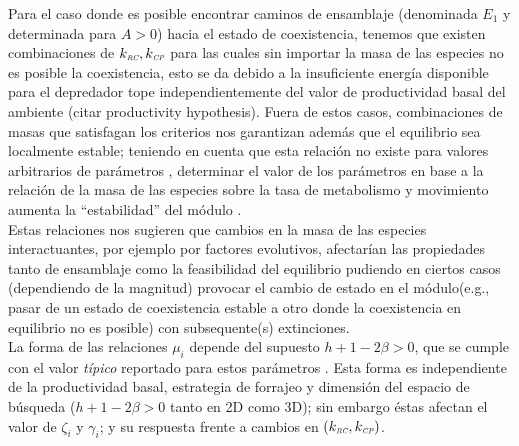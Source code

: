 Para el caso donde es posible encontrar caminos de ensamblaje (denominada $E_1$ y determinada para $A > 0$) hacia el estado de coexistencia, tenemos que existen combinaciones de $k_{\textit{\tiny RC}}, k_{\textit{\tiny CP}}$ para las cuales sin importar la masa de las especies no es posible la coexistencia, esto se da debido a la insuficiente energ\'ia disponible para el depredador tope independientemente del valor de productividad basal del ambiente (citar productivity hypothesis). Fuera de estos casos, combinaciones de masas que satisfagan los criterios nos garantizan adem\'as que el equilibrio sea localmente estable; teniendo en cuenta que esta relaci\'on no existe para valores arbitrarios de par\'ametros \citep{holt1997theoretical}, determinar el valor de los par\'ametros en base a la relaci\'on de la masa de las especies sobre la tasa de metabolismo y movimiento aumenta la ``estabilidad'' del m\'odulo \citep{brose2006allometric,tangpawarallesina2014}. \\

Estas relaciones nos sugieren que cambios en la masa de las especies interactuantes, por ejemplo por factores evolutivos, afectar\'ian las propiedades tanto de ensamblaje como la feasibilidad del equilibrio pudiendo en ciertos casos (dependiendo de la magnitud) provocar el cambio de estado en el m\'odulo(e.g., pasar de un estado de coexistencia estable a otro donde la coexistencia en equilibrio no es posible) con subsequente(s) extinciones.\\

La forma de las relaciones $\mu_i$ depende del supuesto $ h + 1 - 2\beta > 0$, que se cumple con el valor \emph{t\'ipico} reportado para estos par\'ametros \citep{pawar2012dimensionality,brown2004toward}. Esta forma es independiente de la productividad basal, estrategia de forrajeo y dimensi\'on del espacio de b\'usqueda ($h +1 - 2\beta > 0$ tanto en 2D como 3D); sin embargo \'estas afectan el valor de $\zeta_i$ y $\gamma_i$; y su respuesta frente a cambios en $(k_{\textit{\tiny RC}},k_{\textit{\tiny CP}})$.\\

